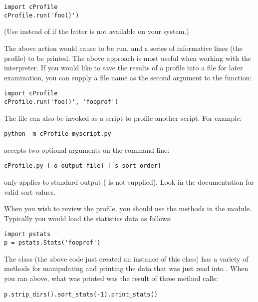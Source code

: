 \begin{verbatim}
import cProfile
cProfile.run('foo()')
\end{verbatim}

(Use  instead of  if the latter is not
available on your system.)

The above action would cause  to be run, and a series of
informative lines (the profile) to be printed.  The above approach is
most useful when working with the interpreter.  If you would like to
save the results of a profile into a file for later examination, you
can supply a file name as the second argument to the 
function:

\begin{verbatim}
import cProfile
cProfile.run('foo()', 'fooprof')
\end{verbatim}

The file  can also be invoked as
a script to profile another script.  For example:

\begin{verbatim}
python -m cProfile myscript.py
\end{verbatim}

 accepts two optional arguments on the command line:

\begin{verbatim}
cProfile.py [-o output_file] [-s sort_order]
\end{verbatim}

 only applies to standard output ( is
not supplied).  Look in the  documentation for valid sort
values.

When you wish to review the profile, you should use the methods in the
 module.  Typically you would load the statistics data as
follows:

\begin{verbatim}
import pstats
p = pstats.Stats('fooprof')
\end{verbatim}

The class  (the above code just created an instance of
this class) has a variety of methods for manipulating and printing the
data that was just read into .  When you ran
 above, what was printed was the result of three
method calls:

\begin{verbatim}
p.strip_dirs().sort_stats(-1).print_stats()
\end{verbatim}

